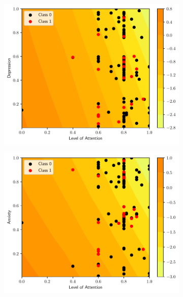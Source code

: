 \documentclass[conference]{IEEEtran}
\theoremstyle{definition}
\theoremstyle{remark}
\theoremstyle{remark}
\begin{document}
\begin{figure}
    \centering
    \begin{subfigure}[b]{0.32\textwidth}
        \centering
        \includegraphics[width=\textwidth]{figs/svm-poly-contour-0-3.pdf}
        \caption{}
    \end{subfigure}
    \begin{subfigure}[b]{0.32\textwidth}
        \centering
        \includegraphics[width=\textwidth]{figs/svm-poly-contour-0-4.pdf}
        \caption{}
    \end{subfigure}
    \begin{subfigure}[b]{0.32\textwidth}

\end{subfigure}
\end{figure}
\end{document}
